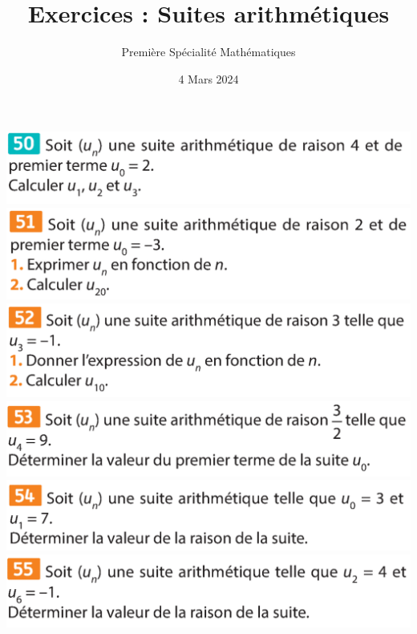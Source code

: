 \documentclass{article}
\title{Exercices : Suites arithmétiques}
\author{Première Spécialité Mathématiques}
\date{4 Mars 2024}
\begin{document}
\maketitle
\begin{center}
\includegraphics[width=\textwidth]{Exercice_1.png}
\includegraphics[width=\textwidth]{Exercice_2.png}
\includegraphics[width=\textwidth]{Exercice_3.png}
\includegraphics[width=\textwidth]{Exercice_4.png}
\includegraphics[width=\textwidth]{Exercice_5.png}
\includegraphics[width=\textwidth]{Exercice_6.png}
\end{center}
\end{document}
